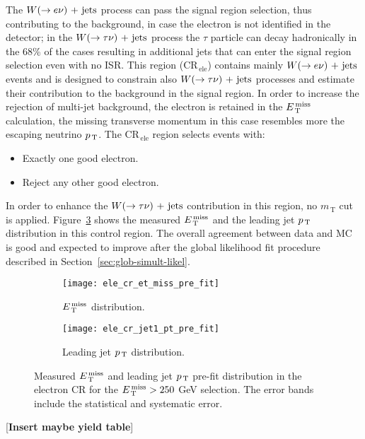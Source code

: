 The $W (\rightarrow e \nu)\mathrm{~+~jets}$ process can pass the signal region selection, thus
contributing to the background, in case the electron is not identified in the
detector; in the $W (\rightarrow \tau \nu)\mathrm{~+~jets}$ process the $\tau$ particle can decay
hadronically in the 68\% of the cases resulting in additional jets that can
enter the signal region selection even with no ISR\@. This region
(CR$_\mathrm{\, ele}$) contains mainly $W (\rightarrow e \nu)\mathrm{~+~jets}$ events and is designed to
constrain also $W (\rightarrow \tau \nu)\mathrm{~+~jets}$ processes and estimate their contribution to
the background in the signal region. In order to increase the rejection of
multi-jet background, the electron is retained in the $E_\mathrm{\, T}^\mathrm{\, miss}$ calculation, the
missing transverse momentum in this case resembles more the escaping neutrino
$p_\mathrm{\, T}$. The CR$_\mathrm{\, ele}$ region selects events with:
\begin{itemize}
\item Exactly one good electron.
\item Reject any other good electron.
\end{itemize}
In order to enhance the $W (\rightarrow \tau \nu)\mathrm{~+~jets}$ contribution in this region, no
$m_\mathrm{\, T}$ cut is applied. Figure~\ref{fig:ele_cr_plots} shows the
measured $E_\mathrm{\, T}^\mathrm{\, miss}$ and the leading jet $p_\mathrm{\, T}$ distribution in this control
region. The overall agreement between data and MC is good and expected to
improve after the global likelihood fit procedure described in
Section~\ref{sec:glob-simult-likel}.

\begin{figure}[!h]
  \centering
  \begin{subfigure}[t]{.48\linewidth}
    \texttt{[image: ele\_cr\_et\_miss\_pre\_fit]}
    \caption{$E_\mathrm{\, T}^\mathrm{\, miss}$ distribution.}
    \label{fig:ele_cr_et_miss_pre_fit}
  \end{subfigure}
  \begin{subfigure}[t]{.48\linewidth}
    \texttt{[image: ele\_cr\_jet1\_pt\_pre\_fit]}
    \caption{Leading jet $p_\mathrm{\, T}$ distribution.}
    \label{fig:ele_cr_jet1_pt_pre_fit}
  \end{subfigure}
  \caption{Measured $E_\mathrm{\, T}^\mathrm{\, miss}$ and leading jet $p_\mathrm{\, T}$ pre-fit distribution in the
    electron CR for the $E_\mathrm{\, T}^\mathrm{\, miss} > 250~$GeV selection. The error bands include
    the statistical and systematic error.}
  \label{fig:ele_cr_plots}
\end{figure}

\mbox{}

[\textbf{Insert maybe yield table}]
